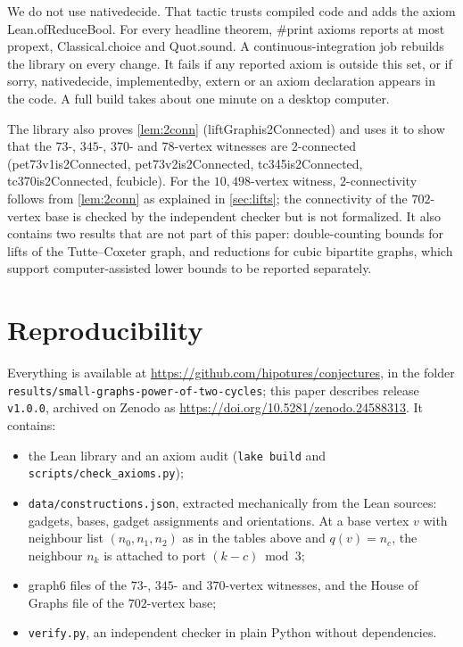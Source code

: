 \documentclass[11pt]{amsart}
\theoremstyle{definition}
\theoremstyle{remark}
\newcommand{\leanus}{\textunderscore\allowbreak}
\newcommand{\lean}[1]{{\ttfamily\let\_\leanus #1}}
\begin{document}
We do not use \lean{native\_decide}. That tactic trusts compiled code and adds
the axiom \lean{Lean.ofReduceBool}. For every headline theorem,
\lean{\#print axioms} reports at most \lean{propext}, \lean{Classical.choice}
and \lean{Quot.sound}. A continuous-integration job rebuilds the library on
every change. It fails if any reported axiom is outside this set, or if
\lean{sorry}, \lean{native\_decide}, \lean{implemented\_by}, \lean{extern} or an
\lean{axiom} declaration appears in the code. A full build takes about one
minute on a desktop computer.

The library also proves \cref{lem:2conn} (\lean{liftGraph\_is2Connected}) and
uses it to show that the $73$-, $345$-, $370$- and $78$-vertex witnesses are
$2$-connected (\lean{pet73v1\_is2Connected}, \lean{pet73v2\_is2Connected},
\lean{tc345\_is2Connected}, \lean{tc370\_is2Connected},
\lean{f\_cubic\_4\_le\_78}). For the $10{,}498$-vertex witness, $2$-connectivity
follows from \cref{lem:2conn} as explained in \cref{sec:lifts}; the connectivity
of the $702$-vertex base is checked by the independent checker but is not
formalized. It also contains two results that are not part of this paper:
double-counting bounds for lifts of the Tutte--Coxeter graph, and reductions for
cubic bipartite graphs, which support computer-assisted lower bounds to be
reported separately.

\section{Reproducibility}\label{sec:repro}

Everything is available at \url{https://github.com/hipotures/conjectures}, in
the folder \texttt{results/small-graphs-power-of-two-cycles}; this paper
describes release \texttt{v1.0.0}, archived on Zenodo as
\url{https://doi.org/10.5281/zenodo.24588313}. It contains:
\begin{itemize}[leftmargin=1.5em]
\item the Lean library and an axiom audit (\texttt{lake build} and
  \texttt{scripts/check\_axioms.py});
\item \texttt{data/constructions.json}, extracted mechanically from the Lean
  sources: gadgets, bases, gadget assignments and orientations. At a base vertex
  $v$ with neighbour list $(n_0,n_1,n_2)$ as in the tables above and
  $q(v)=n_c$, the neighbour $n_k$ is attached to port $(k-c)\bmod 3$;
\item graph6 files of the $73$-, $345$- and $370$-vertex witnesses, and the
  House of Graphs file of the $702$-vertex base;
\item \texttt{verify.py}, an independent checker in plain Python without
  dependencies.
\end{itemize}
\end{document}
